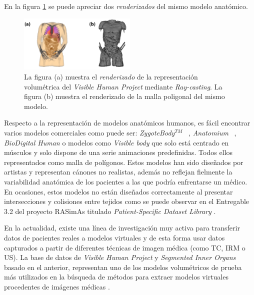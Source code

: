 

En la figura \ref{fig:HVP} se puede apreciar dos \emph{renderizados} del mismo modelo anatómico.

\begin{figure}[h]
   \centering
    \includegraphics[width=0.5\textwidth]{IMG/volvsb-rep.png}
    \caption{La figura (a) muestra el \emph{renderizado} de la representación volumétrica del \emph{Visible Human Project}\cite{ackerman1998visible} mediante \emph{Ray-casting}. La figura (b) muestra el renderizado de la malla poligonal del mismo modelo. }
   \label{fig:HVP}
\end{figure}



Respecto a la representación de modelos anatómicos humanos, es fácil encontrar  varios modelos comerciales como puede ser: \emph{ZygoteBody}$^{TM}$ ~\cite{kelc2012zygote}, \emph{Anatomium} ~\cite{Anatomium}, \emph{BioDigital Human} \cite{qualter2012biodigital} o modelos como \emph{Visible body}\cite{visible2012visible} que solo está centrado en músculos y solo dispone de una serie animaciones predefinidas. Todos ellos representados como malla de polígonos. Estos modelos han sido diseñados por artistas y representan cánones no realistas, además no reflejan fielmente la variabilidad anatómica de los pacientes a las que podría enfrentarse un médico. En ocasiones, estos modelos no están diseñados correctamente al presentar intersecciones y colisiones entre tejidos como se puede observar en el Entregable 3.2 del proyecto \ac{RASimAs} titulado \emph{Patient-Specific Dataset Library} \cite{ded3.2}.

En la actualidad, existe una línea de investigación muy activa para transferir datos de pacientes reales a modelos virtuales y de esta forma usar datos capturados a partir de diferentes técnicas de imagen médica (como \ac{TC}, \ac{IRM} o \ac{US}). La base de datos de  \emph{Visible Human Project}\cite{ackerman1998visible} y  \emph{Segmented Inner Organs}\cite{VoxelMan} basado en el anterior, representan uno de los modelos volumétricos de prueba más utilizados en la búsqueda de métodos para extraer modelos virtuales procedentes de imágenes médicas \cite{ferrante2017slice}.

